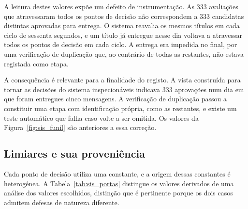 A leitura destes valores expõe um defeito de instrumentação. As $333$ avaliações que atravessaram
todos os pontos de decisão não correspondem a $333$ candidatas distintas aprovadas para entrega. O
sistema reavalia os mesmos títulos em cada ciclo de sessenta segundos, e um título já entregue
nesse dia voltava a atravessar todos os pontos de decisão em cada ciclo. A entrega era impedida no
final, por uma verificação de duplicação que, ao contrário de todas as restantes, não estava
registada como etapa.

A consequência é relevante para a finalidade do registo. A vista construída para tornar as
decisões do sistema inspecionáveis indicava $333$ aprovações num dia em que foram entregues cinco
mensagens. A verificação de duplicação passou a constituir uma etapa com identificação própria,
como as restantes, e existe um teste automático que falha caso volte a ser omitida. Os valores da Figura~\ref{fig:sis_funil} são anteriores a essa correção.

\subsection{Limiares e sua proveniência}

Cada ponto de decisão utiliza uma constante, e a origem dessas constantes é heterogénea. A
Tabela~\ref{tab:sis_portas} distingue os valores derivados de uma análise dos valores escolhidos,
distinção que é pertinente porque os dois casos admitem defesas de natureza diferente.

